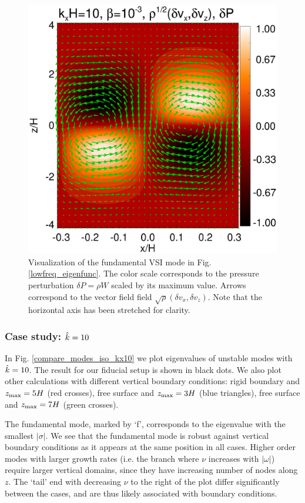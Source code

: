 \begin{figure}
  \includegraphics[width=\linewidth]{figures/result2d_iso}
  \caption{Visualization of the fundamental VSI mode in
    Fig. \ref{lowfreq_eigenfunc}. The color scale corresponds to the
    pressure perturbation $\delta P=\rho W$ scaled by its maximum value.
    Arrows correspond to the vector field field $\sqrt{\rho}(\delta
    v_x,\delta v_z)$. Note that the horizontal axis has been stretched 
    for clarity.  
    \label{lowfreq_eigenfunc_2d}
  }
\end{figure}


\subsubsection{Case study: $\hat{k}=10$}
In Fig. \ref{compare_modes_iso_kx10} we plot eigenvalues of unstable 
modes with $\hat{k}=10$. The result for our fiducial setup is shown
in black dots. We also plot other calculations with different
vertical boundary conditions: rigid boundary and $z_\mathrm{max}=5H$ (red
crosses),  free surface and $z_\mathrm{max} = 3H$ (blue triangles), free surface
and $z_\mathrm{max}=7H$ (green crosses). 

The fundamental mode, marked by `f', corresponds to the eigenvalue
with the smallest $|\sigma|$. We see that the fundamental mode is
robust against vertical boundary conditions as it appears at the same
position in all cases. Higher order modes with larger growth rates
(i.e. the branch where $\nu$ increases with $|\omega|$) require larger
vertical domains, since they have increasing number of nodes along 
$z$. The `tail' end with decreasing $\nu$ to the right
of the plot differ significantly between the cases, and are thus
likely associated with boundary conditions. 

